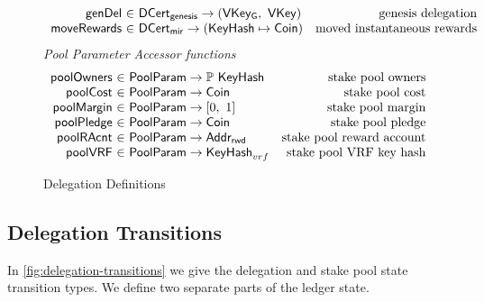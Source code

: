 \begin{figure}[htb]
\begin{equation*}
\begin{array}{r@{~\in~}lr}
      \fun{genDel} & \DCertGen \to (\VKeyGen,~\VKey)
                                            & \text{genesis delegation}
      \\
      \fun{moveRewards} & \DCertMir \to (\KeyHash \mapsto \Coin)
                                            & \text{moved instantaneous rewards}
    \end{array}
  \end{equation*}
  \emph{Pool Parameter Accessor functions}
  \begin{equation*}
  \begin{array}{r@{~\in~}lr}
    \fun{poolOwners} & \PoolParam \to \powerset{\KeyHash}
                     & \text{stake pool owners}
    \\
    \fun{poolCost} & \PoolParam \to \Coin
                     & \text{stake pool cost}
    \\
    \fun{poolMargin} & \PoolParam \to \unitInterval
                     & \text{stake pool margin}
    \\
    \fun{poolPledge} & \PoolParam \to \Coin
                     & \text{stake pool pledge}
    \\
    \fun{poolRAcnt} & \PoolParam \to \AddrRWD
                     & \text{stake pool reward account}
    \\
    \fun{poolVRF} & \PoolParam \to \KeyHash_{vrf}
                  & \text{stake pool VRF key hash}
    \\
  \end{array}
  \end{equation*}

  \caption{Delegation Definitions}
  \label{fig:delegation-defs}
\end{figure}

\clearpage

\subsection{Delegation Transitions}
\label{sec:deleg-trans}


In \cref{fig:delegation-transitions} we give the delegation and stake pool
state transition types. We define two separate parts of the ledger state.

